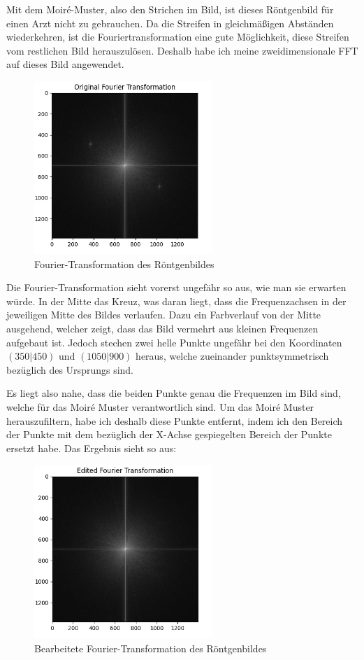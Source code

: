 \documentclass[a4paper,12pt]{article}
\theoremstyle{definition}
\theoremstyle{remark}
\begin{document}
Mit dem Moiré-Muster, also den Strichen im Bild, ist dieses Röntgenbild für einen Arzt nicht zu gebrauchen. Da die Streifen in gleichmäßigen Abständen wiederkehren,
ist die Fouriertransformation eine gute Möglichkeit, diese Streifen vom restlichen Bild herauszulösen. Deshalb habe ich meine zweidimensionale FFT auf dieses Bild angewendet. 

\begin{figure}[H]
\centering
\includegraphics[width=0.6\textwidth]{Bilder/fft_original.png}
\caption{Fourier-Transformation des Röntgenbildes}
\end{figure}

Die Fourier-Transformation sieht vorerst ungefähr so aus, wie man sie erwarten würde. In der Mitte das Kreuz, was daran liegt, dass die Frequenzachsen in der jeweiligen Mitte 
des Bildes verlaufen. Dazu ein Farbverlauf von der Mitte ausgehend, welcher zeigt, dass das Bild vermehrt aus kleinen Frequenzen aufgebaut ist. Jedoch stechen zwei 
helle Punkte ungefähr bei den Koordinaten $\left(350 \vert 450\right)$ und $\left(1050 \vert 900\right)$ heraus, welche zueinander punktsymmetrisch bezüglich des Ursprungs sind. 

Es liegt also nahe, dass die beiden Punkte genau die Frequenzen im Bild sind, welche für das Moiré Muster verantwortlich sind. Um das Moiré Muster herauszufiltern, habe ich deshalb diese 
Punkte entfernt, indem ich den Bereich der Punkte mit dem bezüglich der X-Achse gespiegelten Bereich der Punkte ersetzt habe. Das Ergebnis sieht so aus:

\begin{figure}[H]
\centering
\includegraphics[width=0.6\textwidth]{Bilder/fft_edited.png}
\caption{Bearbeitete Fourier-Transformation des Röntgenbildes}  
\end{figure}
\end{document}

